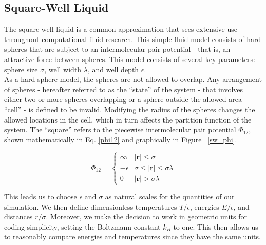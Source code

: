 \documentclass[12pt]{article}
\newcommand{\ignore}[1]{}
\renewcommand{\vec}[1]{\mathbf{#1}}
\begin{document}
\ignore{[move me | For simulation purposes, the system is required to have periodic boundary conditions - that is, when a sphere would classically collide with the wall of the cell it instead breaches the wall and then reappears on the other side of the cell with the same velocity.]}

\subsection{Square-Well Liquid}
The square-well liquid is a common approximation that sees extensive use throughout computational fluid research. This simple fluid model consists of hard spheres that are subject to an intermolecular pair potential - that is, an attractive force between spheres. This model consists of several key parameters: sphere size $\sigma$, well width $\lambda$, and well depth $\epsilon$. \\
As a hard-sphere model, the spheres are not allowed to overlap. Any arrangement of spheres - hereafter referred to as the ``state'' of the system - that involves either two or more spheres overlapping or a sphere outside the allowed area - ``cell'' - is defined to be invalid. Modifying the radius of the spheres changes the allowed locations in the cell, which in turn affects the partition function of the system. The ``square'' refers to the piecewise intermolecular pair potential $\Phi_{12}$, shown mathematically in Eq. \ref{phi12} and graphically in Figure ~\ref{sw_phi}.

\begin{equation} 
\Phi_{12} = \begin{cases}\infty & |\vec{r}|\leq \sigma\\ -\epsilon & \sigma \leq |\vec{r}| \leq \sigma\lambda\\ 0 & |\vec{r}| > \sigma\lambda \end{cases}
\label{phi12}
\end{equation}

This leads us to choose $\epsilon$ and $\sigma$ as natural scales for the quantities of our simulation. We then define dimensionless temperatures $T/\epsilon$, energies $E/\epsilon$, and distances $r/\sigma$. Moreover, we make the decision to work in geometric units for coding simplicity, setting the Boltzmann constant $k_B$ to one. This then allows us to reasonably compare energies and temperatures since they have the same units.
\end{document}

